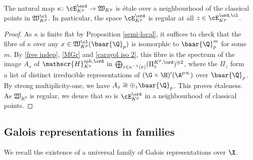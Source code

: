 \begin{prop}
\notready\label{etale} The natural map $\kappa\colon \cE^{\ord}_{K^{p}} \to \mathfrak{W}_{K^{p}}$ is \'etale over a neighbourhood of  the classical  points in $\mathfrak{W}^{\cl}_{K^{p}}$. In particular, the space $\cE^{\ord}_{K^{p}}$ is regular at all $z\in \cE^{\ord, \cl}_{K^{p}}$.
\end{prop}
\begin{proof} As $\kappa $ is finite  flat by Proposition \ref{semi-local}, it suffices to check that the fibre of $\kappa$ over any $x\in \mathfrak{W}^{\cl}_{K^{p}}(\baar{\Q}_{p})$ is isomorphic to  $\baar{\Q}_{p}^{m}$ for some $m$. By \ref{free indep}, \ref{MGr} and \eqref{carayol iso 2}, this fibre  is the spectrum of the image $A_{x}$ of $\mathscr{H}_{K^{p}}^{{\rm sph}, \ord}$
in   $\bigoplus_{z\in \kappa^{-1}(x)} (\Pi_{z}^{K^{p}, \ord})^{\oplus 2}$, where the $\Pi_{z}$ form   a list  of distinct  irreducible representations of $(\G\times \H)'(\A^{p\infty})$ over $\baar{\Q}_{p}$. By strong multiplicity-one, we have $A_{x}\cong \oplus_{z}\baar{\Q}_{p}$. This proves \'etaleness. As $\mathfrak{W}_{K^{p}}$ is regular, we deuce that so is $\cE_{K^{p}}^{\ord}$ in a neighbourhood of classical points.
\end{proof}




























\subsection{Galois representations in families}







We recall the existence of a  universal family of Galois representations over $\X$.
